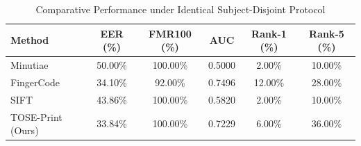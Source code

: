 \begin{table}[t]
\centering
\caption{Comparative Performance under Identical Subject-Disjoint Protocol}
\label{tab:baseline}
\begin{tabular}{lccccc}
\hline
Method & EER (\%) & FMR100 (\%) & AUC & Rank-1 (\%) & Rank-5 (\%) \\
\hline
Minutiae & 50.00\% & 100.00\% & 0.5000 & 2.00\% & 10.00\% \\
FingerCode & 34.10\% & 92.00\% & 0.7496 & 12.00\% & 28.00\% \\
SIFT & 43.86\% & 100.00\% & 0.5820 & 2.00\% & 10.00\% \\
TOSE-Print (Ours) & 33.84\% & 100.00\% & 0.7229 & 6.00\% & 36.00\% \\
\hline
\end{tabular}
\end{table}
